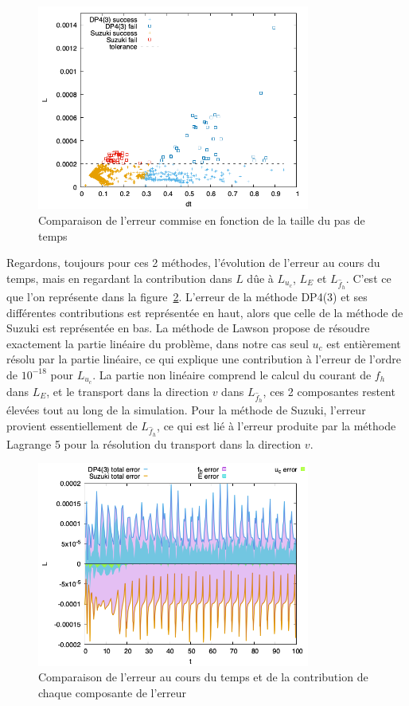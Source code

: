 \begin{figure}[h]
  \centering
  \includegraphics[width=0.8\textwidth]{img/compare_error_dt.png}
  \caption{Comparaison de l'erreur commise en fonction de la taille du pas de temps}
  \label{fig:compare:error:dt}
\end{figure}

Regardons, toujours pour ces 2 méthodes, l'évolution de l'erreur au cours du temps, mais en regardant la contribution dans $L$ d\^ue à $L_{u_c}$, $L_E$ et $L_{\hat{f}_h}$. C'est ce que l'on représente dans la figure~\ref{fig:compare:error:LucEfh}. L'erreur de la méthode DP4(3) et ses différentes contributions est représentée en haut, alors que celle de la méthode de Suzuki est représentée en bas. La méthode de Lawson propose de résoudre exactement la partie linéaire du problème, dans notre cas seul $u_c$ est entièrement résolu par la partie linéaire, ce qui explique une contribution à l'erreur de l'ordre de $10^{-18}$ pour $L_{u_c}$. La partie non linéaire comprend le calcul du courant de $f_h$ dans $L_E$, et le transport dans la direction $v$ dans $L_{\hat{f}_h}$, ces 2 composantes restent élevées tout au long de la simulation. Pour la méthode de Suzuki, l'erreur provient essentiellement de $L_{\hat{f}_h}$, ce qui est  li\'e \`a l'erreur 
produite par la méthode Lagrange 5 pour la résolution du transport dans la direction $v$.

\begin{figure}[h]
  \centering
  \includegraphics[width=0.8\textwidth]{img/compare_error_LucEfh.png}
  \caption{Comparaison de l'erreur au cours du temps et de la contribution de chaque composante de l'erreur}
  \label{fig:compare:error:LucEfh}
\end{figure}

